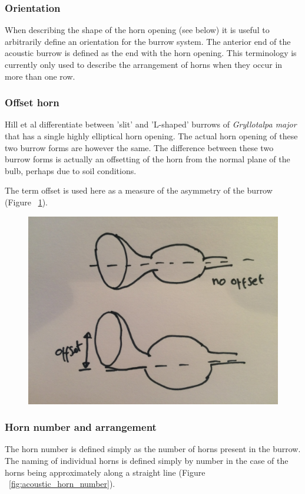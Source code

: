 \documentclass{article}
\begin{document}
   \subsubsection{Orientation}
   When describing the shape of the horn opening (see below) it is useful to arbitrarily define an orientation for the burrow system. The anterior end of the acoustic burrow is defined as the end with the horn opening. This terminology is currently only used to describe the arrangement of horns when they occur in more than one row.
   
   \subsubsection{Offset horn}
   Hill et al \cite{hill2006} differentiate between 'slit' and 'L-shaped' burrows of \textit{Gryllotalpa major} that has a single highly elliptical horn opening. The actual horn opening of these two burrow forms are however the same. The difference between these two burrow forms is actually an offsetting of the horn from the normal plane of the bulb, perhaps due to soil conditions.
   
   The term offset is used here as a measure of the asymmetry of the burrow (Figure ~\ref{fig:acoustic_horn_offset}).
   
   \begin{figure}[h]
   	\includegraphics[width=\textwidth]{acoustic_horn_offset}
   	\caption{}
   	\label{fig:acoustic_horn_offset}
   \end{figure}
   
   \subsubsection{Horn number and arrangement}
   The horn number is defined simply as the number of horns present in the burrow. The naming of individual horns is defined simply by number in the case of the horns being approximately along a straight line (Figure ~\ref{fig:acoustic_horn_number}).
\end{document}
